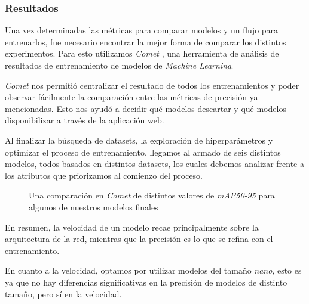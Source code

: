 \documentclass[a4paper]{article}
\begin{document}
\subsubsection{Resultados}

Una vez determinadas las métricas para comparar modelos y un flujo para entrenarlos, fue necesario encontrar la mejor forma de comparar los distintos experimentos. Para esto utilizamos \textit{Comet} \cite{comet}, una herramienta de análisis de resultados de entrenamiento de modelos de \textit{Machine Learning}.

\textit{Comet} nos permitió centralizar el resultado de todos los entrenamientos y poder observar fácilmente la comparación entre las métricas de precisión ya mencionadas. Esto nos ayudó a decidir qué modelos descartar y qué modelos disponibilizar a través de la aplicación web.

Al finalizar la búsqueda de datasets, la exploración de hiperparámetros y optimizar el proceso de entrenamiento, llegamos al armado de seis distintos modelos, todos basados en distintos datasets, los cuales debemos analizar frente a los atributos que priorizamos al comienzo del proceso.

\begin{figure}[H]
\caption{Una comparación en \textit{Comet} de distintos valores de \textit{mAP50-95} para algunos de nuestros modelos finales}
\end{figure}

En resumen, la velocidad de un modelo recae principalmente sobre la arquitectura de la red, mientras que la precisión es lo que se refina con el entrenamiento.

En cuanto a la velocidad, optamos por utilizar modelos del tamaño \textit{nano}, esto es ya que no hay diferencias significativas en la precisión de modelos de distinto tamaño, pero sí en la velocidad.
\end{document}
